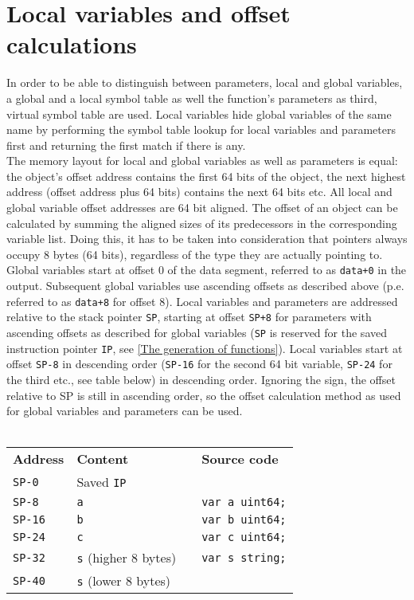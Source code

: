 \documentclass[a4paper]{scrreprt}
\begin{document}
    \section{Local variables and offset calculations}
      In order to be able to distinguish between parameters, local and global variables, a global and a local symbol table as well the function's parameters as third, virtual symbol table are used. Local variables hide global variables of the same name by performing the symbol table lookup for local variables and parameters first and returning the first match if there is any.\\
      The memory layout for local and global variables as well as parameters is equal: the object's offset address contains the first 64 bits of the object, the next highest address (offset address plus 64 bits) contains the next 64 bits etc. All local and global variable offset addresses are 64 bit aligned. The offset of an object can be calculated by summing the aligned sizes of its predecessors in the corresponding variable list. Doing this, it has to be taken into consideration that pointers always occupy 8 bytes (64 bits), regardless of the type they are actually pointing to.\\
      Global variables start at offset 0 of the data segment, referred to as \texttt{data+0} in the output. Subsequent global variables use ascending offsets as described above (p.e. referred to as \texttt{data+8} for offset 8). Local variables and parameters are addressed relative to the stack pointer \texttt{SP}, starting at offset \texttt{SP+8} for parameters with ascending offsets as described for global variables (\texttt{SP} is reserved for the saved instruction pointer \texttt{IP}, see \ref{The generation of functions}). Local variables start at offset \texttt{SP-8} in descending order (\texttt{SP-16} for the second 64 bit variable, \texttt{SP-24} for the third etc., see table below) in descending order. Ignoring the sign, the offset relative to SP is still in ascending order, so the offset calculation method as used for global variables and parameters can be used.\\ \\
      \begin{table}
      \begin{tabular}{llp{2cm}l}
        \cmidrule{1-2}
        \textbf{Address} & \textbf{Content} & & \textbf{Source code}\\
        \cmidrule{1-2}
        \texttt{SP-0} & Saved \texttt{IP} & & \\
        \texttt{SP-8} & \texttt{a} & & \texttt{var a uint64;}\\
        \texttt{SP-16} & \texttt{b} & & \texttt{var b uint64;}\\
        \texttt{SP-24} & \texttt{c} & & \texttt{var c uint64;}\\
        \texttt{SP-32} & \texttt{s} (higher 8 bytes) & & \texttt{var s string;}\\
        \texttt{SP-40} & \texttt{s} (lower 8 bytes) & & \\
        \cmidrule{1-2}
      \end{tabular}
      \end{table}\\ \\
\end{document}
